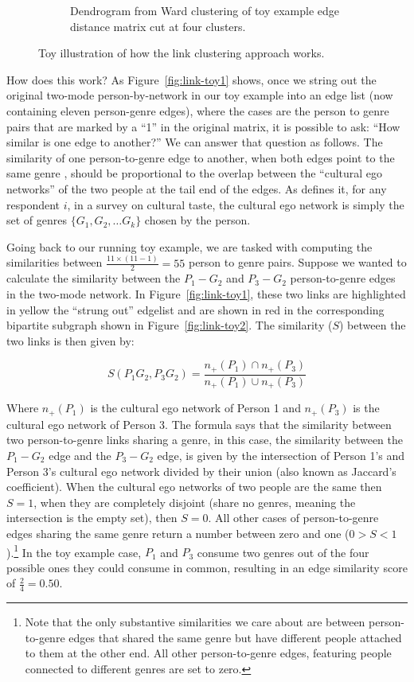 \documentclass[a4paper,12pt]{extarticle}
\begin{document}
\begin{figure}[ht!]
\begin{subfigure}[b]{0.6\textwidth}
        \caption{Dendrogram from Ward clustering of toy example edge distance matrix cut at four clusters.}
        \label{fig:link-toy5}
    \end{subfigure}
    \caption{Toy illustration of how the link clustering approach works.}
    \label{fig:link-toy}
 \end{figure}
 
How does this work? As Figure~\ref{fig:link-toy1} shows, once we string out the original two-mode person-by-network in our toy example into an edge list (now containing eleven person-genre edges), where the cases are the person to genre pairs that are marked by a ``1'' in the original matrix, it is possible to ask: ``How similar is one edge to another?'' We can answer that question as follows. The similarity of one person-to-genre edge to another, when both edges point to the same genre \citep{ahn_etal10}, should be proportional to the overlap between the ``cultural ego networks'' of the two people at the tail end of the edges. As \citet{lizardo14} defines it, for any respondent $i$, in a survey on cultural taste, the cultural ego network is simply the set of genres $\{G_1, G_2,\dots G_k\}$ chosen by the person. 

Going back to our running toy example, we are tasked with computing the similarities between $\frac{11 \times (11-1)}{2} = 55$ person to genre pairs. Suppose we wanted to calculate the similarity between the $P_1-G_2$ and $P_3-G_2$ person-to-genre edges in the two-mode network. In Figure~\ref{fig:link-toy1}, these two links are highlighted in yellow the ``strung out'' edgelist and are shown in red in the corresponding bipartite subgraph shown in Figure~\ref{fig:link-toy2}. The similarity ($S$) between the two links is then given by:

\begin{equation}
    S(P_1G_2, P_3G_2) = \frac{n_+(P_1) \cap n_+(P_3)}{n_+(P_1) \cup n_+(P_3)}
\end{equation}

Where $n_+(P_1)$ is the cultural ego network of Person 1 and $n_+(P_3)$ is the cultural ego network of Person 3. The formula says that the similarity between two person-to-genre links sharing a genre, in this case, the similarity between the $P_1-G_2$ edge and the $P_3-G_2$ edge, is given by the intersection of Person 1's and Person 3's cultural ego network divided by their union (also known as Jaccard's coefficient). When the cultural ego networks of two people are the same then $S=1$, when they are completely disjoint (share no genres, meaning the intersection is the empty set), then $S = 0$. All other cases of person-to-genre edges sharing the same genre return a number between zero and one ($0 > S < 1$).\footnote{Note that the only substantive similarities we care about are between person-to-genre edges that shared the same genre but have different people attached to them at the other end. All other person-to-genre edges, featuring people connected to different genres are set to zero.} In the toy example case, $P_1$ and $P_3$ consume two genres out of the four possible ones they could consume in common, resulting in an edge similarity score of $\frac{2}{4} = 0.50$. 
\end{document}
